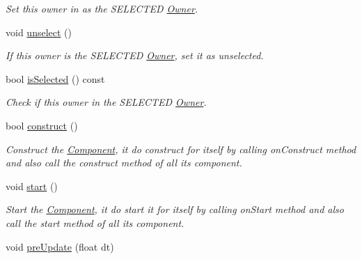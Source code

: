 \begin{DoxyCompactItemize}
\begin{DoxyCompactList}\small\item\em Set this owner in as the S\+E\+L\+E\+C\+T\+ED \hyperlink{class_magnum_1_1_component_1_1_owner}{Owner}. \end{DoxyCompactList}\item 
void \hyperlink{class_magnum_1_1_component_1_1_owner_a586f0cf237741a4d6e37c1f63872aefb}{unselect} ()\hypertarget{class_magnum_1_1_component_1_1_owner_a586f0cf237741a4d6e37c1f63872aefb}{}\label{class_magnum_1_1_component_1_1_owner_a586f0cf237741a4d6e37c1f63872aefb}

\begin{DoxyCompactList}\small\item\em If this owner is the S\+E\+L\+E\+C\+T\+ED \hyperlink{class_magnum_1_1_component_1_1_owner}{Owner}, set it as unselected. \end{DoxyCompactList}\item 
bool \hyperlink{class_magnum_1_1_component_1_1_owner_ad82a85171641ba638ac4334d5bc93cb4}{is\+Selected} () const \hypertarget{class_magnum_1_1_component_1_1_owner_ad82a85171641ba638ac4334d5bc93cb4}{}\label{class_magnum_1_1_component_1_1_owner_ad82a85171641ba638ac4334d5bc93cb4}

\begin{DoxyCompactList}\small\item\em Check if this owner in the S\+E\+L\+E\+C\+T\+ED \hyperlink{class_magnum_1_1_component_1_1_owner}{Owner}. \end{DoxyCompactList}\item 
bool \hyperlink{class_magnum_1_1_component_1_1_owner_a6878b12a1f8e8119da43305d175bf522}{construct} ()
\begin{DoxyCompactList}\small\item\em Construct the \hyperlink{class_magnum_1_1_component}{Component}, it do construct for itself by calling on\+Construct method and also call the construct method of all its component. \end{DoxyCompactList}\item 
void \hyperlink{class_magnum_1_1_component_1_1_owner_a40b2d7b5072754e7517251d52d09c8f2}{start} ()\hypertarget{class_magnum_1_1_component_1_1_owner_a40b2d7b5072754e7517251d52d09c8f2}{}\label{class_magnum_1_1_component_1_1_owner_a40b2d7b5072754e7517251d52d09c8f2}

\begin{DoxyCompactList}\small\item\em Start the \hyperlink{class_magnum_1_1_component}{Component}, it do start it for itself by calling on\+Start method and also call the start method of all its component. \end{DoxyCompactList}\item 
void \hyperlink{class_magnum_1_1_component_1_1_owner_aae6b25b4cfa051ad7a76ad5ac59f08c7}{pre\+Update} (float dt)\hypertarget{class_magnum_1_1_component_1_1_owner_aae6b25b4cfa051ad7a76ad5ac59f08c7}{}\label{class_magnum_1_1_component_1_1_owner_aae6b25b4cfa051ad7a76ad5ac59f08c7}


\end{DoxyCompactItemize}

